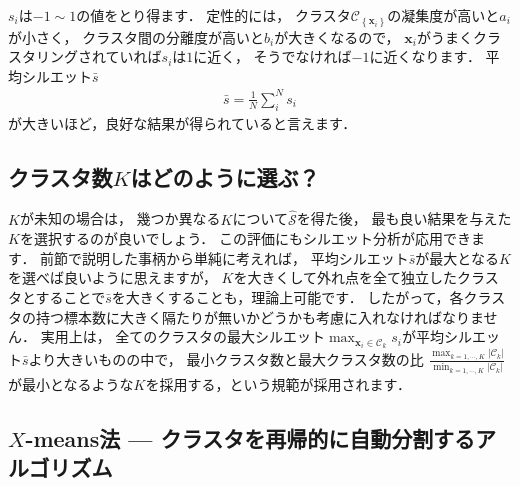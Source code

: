 ﻿\documentclass{jsarticle}
\begin{document}
$s_{i}$は$-1\sim 1$の値をとり得ます．
定性的には，
クラスタ$\mathcal{C}_{\left\{\bm{x}_{i}\right\}}$の凝集度が高いと$a_{i}$が小さく，
クラスタ間の分離度が高いと$b_{i}$が大きくなるので，
$\bm{x}_{i}$がうまくクラスタリングされていれば$s_{i}$は$1$に近く，
そうでなければ$-1$に近くなります．
平均シルエット$\bar{s}$
\begin{align*}
\bar{s}=\frac{1}{N}\sum_{i}^{N}s_{i}
\end{align*}
が大きいほど，良好な結果が得られていると言えます．


\subsection{クラスタ数$K$はどのように選ぶ？}

$K$が未知の場合は，
幾つか異なる$K$について$\hat{\mathcal{S}}$を得た後，
最も良い結果を与えた$K$を選択するのが良いでしょう．
この評価にもシルエット分析が応用できます\cite{bib:deAmorim2015is}．
前節で説明した事柄から単純に考えれば，
平均シルエット$\bar{s}$が最大となる$K$を選べば良いように思えますが，
$K$を大きくして外れ点を全て独立したクラスタとすることで$\bar{s}$を大きくすることも，理論上可能です．
したがって，各クラスタの持つ標本数に大きく隔たりが無いかどうかも考慮に入れなければなりません．
実用上は，
全てのクラスタの最大シルエット$\max_{\bm{x}_{i}\in\mathcal{C}_{k}}s_{i}$が平均シルエット$\bar{s}$より大きいものの中で，
最小クラスタ数と最大クラスタ数の比
$\displaystyle\frac{\max_{k=1,\cdots,K}\left|\mathcal{C}_{k}\right|}{\min_{k=1,\cdots,K}\left|\mathcal{C}_{k}\right|}$
が最小となるような$K$を採用する，という規範が採用されます．

\subsection{$X$-means法 --- クラスタを再帰的に自動分割するアルゴリズム}
\end{document}
